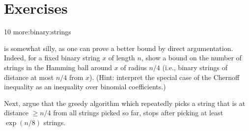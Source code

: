 \section{Exercises}

%
{10}%
{more:binary:strings}%
{%
    is somewhat silly, as one can prove a better bound by
   direct argumentation. Indeed, for a fixed binary string $x$ of length
   $n$, show a bound on the number of strings in the Hamming ball around
   $x$ of radius $n/4$ (i.e., binary strings of distance at most $n/4$
   from $x$). (Hint: interpret the special case of the Chernoff
   inequality as an inequality over binomial coefficients.)

   Next, argue that the greedy algorithm which repeatedly picks a
   string that is at distance $\geq n/4$ from all strings picked so
   far, stops after picking at least $\exp(n/8)$ strings. %
}{}




\ChapterEnd{}

